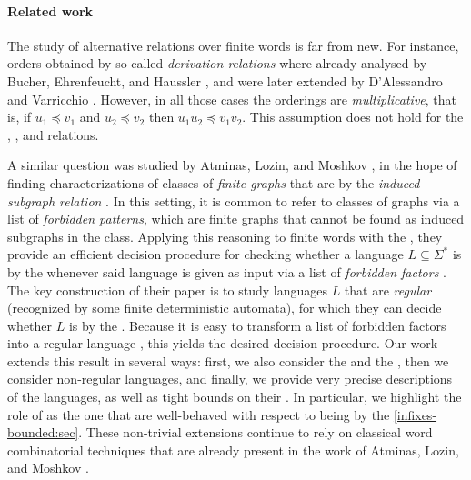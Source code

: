
\paragraph*{Related work} The study of alternative 
relations over finite words is far from new. For instance, orders obtained by
so-called \emph{derivation relations} where already analysed by Bucher,
Ehrenfeucht, and Haussler \cite{BUEUD85}, and were later extended by
D'Alessandro and Varricchio \cite{ALVA03,ALVA06}. However, in all those cases
the orderings are \emph{multiplicative}, that is, if $u_1 \preceq v_1$ and $u_2
\preceq v_2$ then $u_1u_2 \preceq v_1v_2$. This assumption does not hold for
the , , and  relations.

A similar question was studied by Atminas, Lozin, and Moshkov \cite{ALM17}, in
the hope of finding characterizations of classes of \emph{finite graphs} that
are  by the \emph{induced subgraph relation}
\cite[Section 7]{ALM17}. In this setting, it is common to refer to classes of
graphs via a list of \emph{forbidden patterns}, which are finite graphs that
cannot be found as induced subgraphs in the class. Applying this reasoning to
finite words with the , they provide an efficient decision
procedure for checking whether a language $L \subseteq \Sigma^*$ is
 by the  whenever said language is
given as input via a list of \emph{forbidden factors} \cite[Theorem 1, Theorem
2]{ALM17}. The key construction of their paper is to study languages $L$ that
are \emph{regular} (recognized by some finite deterministic automata), for
which they can decide whether $L$ is  by the  \cite[Theorem 1]{ALM17}. Because it is easy to transform a list of
forbidden factors into a regular language \cite[Theorem 1]{ALM17}, this yields
the desired decision procedure. Our work extends this result in several ways:
first, we also consider the  and the ,
then we consider non-regular languages, and finally, we provide very precise
descriptions of the  languages, as well as tight bounds
on their . In particular, we highlight the role of
 as the one that are well-behaved with respect to being
 by the  \cref{infixes-bounded:sec}.
These non-trivial extensions continue to rely
on classical word combinatorial techniques that are already present in the work
of Atminas, Lozin, and Moshkov \cite[Section 3]{ALM17}.

